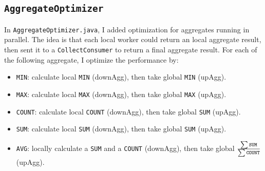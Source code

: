 \documentclass[12pt]{myland}
\def\<#1>{\texttt{#1}}
\begin{document}
    \subsection{\<AggregateOptimizer>}
    In \<AggregateOptimizer.java>, I added optimization for aggregates running in parallel. The idea is that each local
    worker could return an local aggregate result, then sent it to a \<CollectConsumer> to return a final aggregate
    result. For each of the following aggregate, I optimize the performance by:
    \begin{itemize}
        \item \<MIN>: calculate local \<MIN> (downAgg), then take global \<MIN> (upAgg).
        \item \<MAX>: calculate local \<MAX> (downAgg), then take global \<MAX> (upAgg).
        \item \<COUNT>: calculate local \<COUNT> (downAgg), then take global \<SUM> (upAgg).
        \item \<SUM>: calculate local \<SUM> (downAgg), then take global \<SUM> (upAgg).
        \item \<AVG>: locally calculate a \<SUM> and a \<COUNT> (downAgg), then take global
            $\frac{\sum\text{\<SUM>}}{\sum\text{\<COUNT>}}$ (upAgg).
    \end{itemize}
\end{document}

